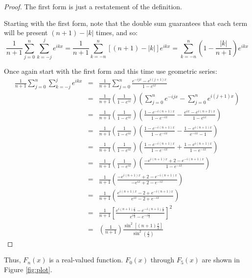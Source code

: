 \documentclass[letterpaper,12pt,fleqn,reqno]{amsart}
\theoremstyle{plain}
\newcommand{\abs}[1]{\left|#1\right|}
\begin{document}
\begin{proof}
  The first form is just a restatement of the definition.

  Starting with the first form, note that the double sum guarantees that each
  term will be present $(n+1)-\abs{k}$ times, and so:
  \[\frac{1}{n+1}\sum_{j=0}^n\sum_{k=-j}^je^{ikx}=
  \frac{1}{n+1}\sum_{k=-n}^n[(n+1)-\abs{k}]e^{ikx}=
  \sum_{k=-n}^n\left(1-\frac{\abs{k}}{n+1}\right)e^{ikx}\]

  Once again start with the first form and this time use geometric series:
  \begin{eqnarray*}
    \frac{1}{n+1}\sum_{j=0}^n\sum_{k=-j}^je^{ikx} &=&
    \frac{1}{n+1}\sum_{j=0}^n\frac{e^{-ijx}-e^{i(j+1)x}}{1-e^{ix}} \\
    &=& \frac{1}{n+1}\left(\frac{1}{1-e^{ix}}\right)\left(
    \sum_{j=0}^ne^{-ijx}-\sum_{j=0}^ne^{i(j+1)x}\right) \\
    &=& \frac{1}{n+1}\left(\frac{1}{1-e^{ix}}\right)\left(
    \frac{1-e^{-i(n+1)x}}{1-e^{-ix}}-\frac{e^{ix}-e^{i(n+2)x}}{1-e^{ix}}\right) \\
    &=& \frac{1}{n+1}\left(\frac{1}{1-e^{ix}}\right)\left(
    \frac{1-e^{-i(n+1)x}}{1-e^{-ix}}-\frac{1-e^{i(n+1)x}}{e^{-ix}-1}\right) \\
    &=& \frac{1}{n+1}\left(\frac{1}{1-e^{ix}}\right)\left(
    \frac{1-e^{-i(n+1)x}}{1-e^{-ix}}+\frac{1-e^{i(n+1)x}}{1-e^{-ix}}\right) \\
    &=& \frac{1}{n+1}\left(\frac{1}{1-e^{ix}}\right)\left(
    \frac{-e^{i(n+1)x}+2-e^{-i(n+1)x}}{1-e^{-ix}}\right) \\
    &=& \frac{1}{n+1}\left(
    \frac{-e^{i(n+1)x}+2-e^{-i(n+1)x}}{-e^{ix}+2-e^{-ix}}\right) \\
    &=& \frac{1}{n+1}\left(
    \frac{e^{i(n+1)x}-2+e^{-i(n+1)x}}{e^{ix}-2+e^{-ix}}\right) \\
    &=& \frac{1}{n+1}\left[
      \frac{e^{i(n+1)\frac{x}{2}}-e^{-i(n+1)\frac{x}{2}}}
           {e^{i\frac{x}{2}}-e^{-i\frac{x}{2}}}\right]^2 \\
    &=& \left(\frac{1}{n+1}\right)
    \frac{\sin^2\left[(n+1)\frac{x}{2}\right]}{\sin^2\left(\frac{x}{2}\right)}
  \end{eqnarray*}
\end{proof}

Thus, $F_n(x)$ is a real-valued function. $F_0(x)$ through $F_5(x)$ are shown
in Figure \ref{fig:plot}.
\end{document}
